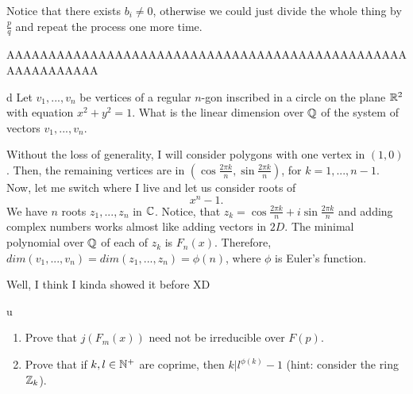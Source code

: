 \documentclass{article}
\begin{document}
Notice that there exists $b_i\neq0$, otherwise we could just divide the whole thing by $\frac{p}{q}$ and repeat the process one more time.

AAAAAAAAAAAAAAAAAAAAAAAAAAAAAAAAAAAAAAAAAAAAAAAAAAAAAAAAAAA



\begin{problem}[3]{d}
Let $v_1,...,v_n$ be vertices of a regular $n$-gon inscribed in a circle on the plane $\mathbb{R}^2$ with equation $x^2+y^2=1$. What is the linear dimension over $\mathbb{Q}$ of the system of vectors $v_1,...,v_n$.
\end{problem}

Without the loss of generality, I will consider polygons with one vertex in $(1, 0)$. Then, the remaining vertices are in $(\cos\frac{2\pi k}{n},\sin\frac{2\pi k}{n})$, for $k=1,...,n-1$. Now, let me switch where I live and let us consider roots of
$$x^n-1.$$
We have $n$ roots $z_1,...,z_n$ in $\mathbb{C}$. Notice, that $z_k=\cos\frac{2\pi k}{n}+i\sin\frac{2\pi k}{n}$ and adding complex numbers works almost like adding vectors in $2D$. The minimal polynomial over $\mathbb{Q}$ of each of $z_k$ is $F_n(x)$. Therefore, $dim(v_1,...,v_n)=dim(z_1,...,z_n)=\phi(n)$, where $\phi$ is Euler's function.


Well, I think I kinda showed it before XD

\begin{problem}[5]{u}
\begin{enumerate}[leftmargin=*, label=(\alph*)]
    \item Prove that $j(F_m(x))$ need not be irreducible over $F(p)$.
    \item Prove that if $k,l\in\mathbb{N}^+$ are coprime, then $k|l^{\phi(k)}-1$ (hint: consider the ring $\mathbb{Z}_k$).
\end{enumerate}
\end{problem}
\end{document}
